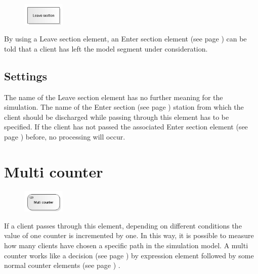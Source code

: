 \begin{figure}
\vspace{-22pt}
\includegraphics[width=2cm]{imageModelElementSectionEnd.png}
\vspace{-22pt}
\end{figure}

By using a Leave section element, an Enter section element (see page \pageref{ref:ModelElementSectionStart}) 
can be told that a client has left the model segment under consideration.

\subsection*{Settings}

The name of the Leave section element has no further meaning for the simulation.
The name of the Enter section (see page \pageref{ref:ModelElementSectionStart}) station
from which the client should be discharged while passing through this element has
to be specified. If the client has not passed the associated
Enter section element (see page \pageref{ref:ModelElementSectionStart}) before,
no processing will occur.


\section{Multi counter}
\label{ref:ModelElementCounterMulti}

\begin{figure}
\vspace{-22pt}
\includegraphics[width=2cm]{imageModelElementCounterMulti.png}
\vspace{-22pt}
\end{figure}

If a client passes through this element, depending on different conditions the value
of one counter is incremented by one. In this way, it is possible to measure how many
clients have chosen a specific path in the simulation model. A multi counter works
like a decision (see page \pageref{ref:ModelElementDecide}) by expression element followed
by some normal counter elements (see page \pageref{ref:ModelElementCounter}) .

